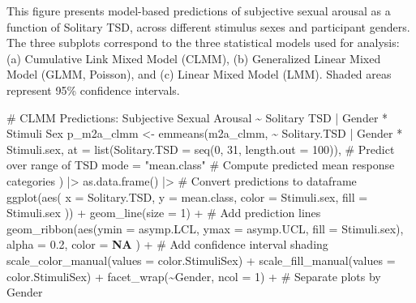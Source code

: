 \documentclass[
  bookmarksnumbered]{article}
\newenvironment{Shaded}{\begin{snugshade}}{\end{snugshade}}
\newcommand{\AttributeTok}[1]{\textcolor[rgb]{0.80,0.80,0.80}{#1}}
\newcommand{\CommentTok}[1]{\textcolor[rgb]{0.50,0.62,0.50}{#1}}
\newcommand{\ConstantTok}[1]{\textcolor[rgb]{0.86,0.64,0.64}{\textbf{#1}}}
\newcommand{\DecValTok}[1]{\textcolor[rgb]{0.86,0.86,0.80}{#1}}
\newcommand{\FloatTok}[1]{\textcolor[rgb]{0.75,0.75,0.82}{#1}}
\newcommand{\FunctionTok}[1]{\textcolor[rgb]{0.94,0.94,0.56}{#1}}
\newcommand{\NormalTok}[1]{\textcolor[rgb]{0.80,0.80,0.80}{#1}}
\newcommand{\OtherTok}[1]{\textcolor[rgb]{0.94,0.94,0.56}{#1}}
\newcommand{\SpecialCharTok}[1]{\textcolor[rgb]{0.86,0.64,0.64}{#1}}
\newcommand{\StringTok}[1]{\textcolor[rgb]{0.80,0.58,0.58}{#1}}
\begin{document}
This figure presents model-based predictions of subjective sexual arousal as a function of Solitary TSD, across different stimulus sexes and participant genders. The three subplots correspond to the three statistical models used for analysis: (a) Cumulative Link Mixed Model (CLMM), (b) Generalized Linear Mixed Model (GLMM, Poisson), and (c) Linear Mixed Model (LMM). Shaded areas represent 95\% confidence intervals.

\begin{Shaded}
\begin{Highlighting}[]
\CommentTok{\# CLMM Predictions: Subjective Sexual Arousal \textasciitilde{} Solitary TSD | Gender * Stimuli Sex}
\NormalTok{p\_m2a\_clmm }\OtherTok{\textless{}{-}} \FunctionTok{emmeans}\NormalTok{(m2a\_clmm, }\SpecialCharTok{\textasciitilde{}}\NormalTok{ Solitary.TSD }\SpecialCharTok{|}\NormalTok{ Gender }\SpecialCharTok{*}\NormalTok{ Stimuli.sex,}
  \AttributeTok{at =} \FunctionTok{list}\NormalTok{(}\AttributeTok{Solitary.TSD =} \FunctionTok{seq}\NormalTok{(}\DecValTok{0}\NormalTok{, }\DecValTok{31}\NormalTok{, }\AttributeTok{length.out =} \DecValTok{100}\NormalTok{)), }\CommentTok{\# Predict over range of TSD}
  \AttributeTok{mode =} \StringTok{"mean.class"} \CommentTok{\# Compute predicted mean response categories}
\NormalTok{) }\SpecialCharTok{|\textgreater{}}
  \FunctionTok{as.data.frame}\NormalTok{() }\SpecialCharTok{|\textgreater{}} \CommentTok{\# Convert predictions to dataframe}
  \FunctionTok{ggplot}\NormalTok{(}\FunctionTok{aes}\NormalTok{(}
    \AttributeTok{x =}\NormalTok{ Solitary.TSD, }\AttributeTok{y =}\NormalTok{ mean.class,}
    \AttributeTok{color =}\NormalTok{ Stimuli.sex, }\AttributeTok{fill =}\NormalTok{ Stimuli.sex}
\NormalTok{  )) }\SpecialCharTok{+}
  \FunctionTok{geom\_line}\NormalTok{(}\AttributeTok{size =} \DecValTok{1}\NormalTok{) }\SpecialCharTok{+} \CommentTok{\# Add prediction lines}
  \FunctionTok{geom\_ribbon}\NormalTok{(}\FunctionTok{aes}\NormalTok{(}\AttributeTok{ymin =}\NormalTok{ asymp.LCL, }\AttributeTok{ymax =}\NormalTok{ asymp.UCL, }\AttributeTok{fill =}\NormalTok{ Stimuli.sex),}
    \AttributeTok{alpha =} \FloatTok{0.2}\NormalTok{, }\AttributeTok{color =} \ConstantTok{NA}
\NormalTok{  ) }\SpecialCharTok{+} \CommentTok{\# Add confidence interval shading}
  \FunctionTok{scale\_color\_manual}\NormalTok{(}\AttributeTok{values =}\NormalTok{ color.StimuliSex) }\SpecialCharTok{+}
  \FunctionTok{scale\_fill\_manual}\NormalTok{(}\AttributeTok{values =}\NormalTok{ color.StimuliSex) }\SpecialCharTok{+}
  \FunctionTok{facet\_wrap}\NormalTok{(}\SpecialCharTok{\textasciitilde{}}\NormalTok{Gender, }\AttributeTok{ncol =} \DecValTok{1}\NormalTok{) }\SpecialCharTok{+} \CommentTok{\# Separate plots by Gender}

\end{Highlighting}
\end{Shaded}
\end{document}
